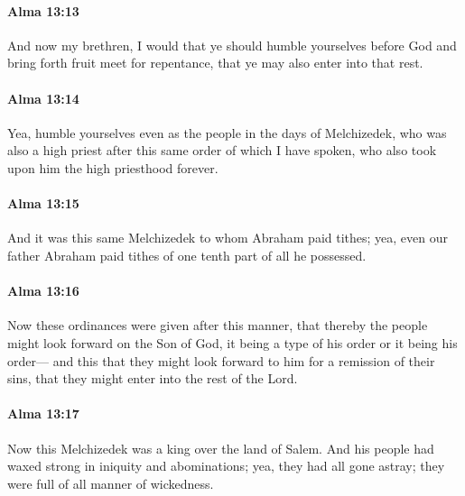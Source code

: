 		\paragraph{Alma 13:13} %
			\label{ALMA-13-13}

			And now my brethren, I would that ye should humble yourselves before God
			and bring forth fruit meet for repentance,
			that ye may also enter into that rest.

		\paragraph{Alma 13:14} %
			\label{ALMA-13-14}

			Yea, humble yourselves even as the people in the days of Melchizedek,
			who was also a high priest after this same order of which I have spoken,
			who also took upon him the high priesthood forever.

		\paragraph{Alma 13:15} %
			\label{ALMA-13-15}

			And it was this same Melchizedek to whom Abraham paid tithes;
			yea, even our father Abraham paid tithes of one tenth part of all he possessed.

		\paragraph{Alma 13:16} %
			\label{ALMA-13-16}

			Now these ordinances were given after this manner,
			that thereby the people might look forward on the Son of God,
			it being a type of his order or it being his order---
			and this that they might look forward to him for a remission of their sins,
			that they might enter into the rest of the Lord.

		\paragraph{Alma 13:17} %
			\label{ALMA-13-17}

			Now this Melchizedek was a king over the land of Salem.
			And his people had waxed strong in iniquity and abominations;
			yea, they had all gone astray;
			they were full of all manner of wickedness.

